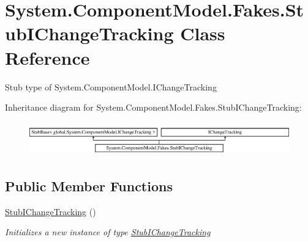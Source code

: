 \hypertarget{class_system_1_1_component_model_1_1_fakes_1_1_stub_i_change_tracking}{\section{System.\-Component\-Model.\-Fakes.\-Stub\-I\-Change\-Tracking Class Reference}
\label{class_system_1_1_component_model_1_1_fakes_1_1_stub_i_change_tracking}
}


Stub type of System.\-Component\-Model.\-I\-Change\-Tracking 


Inheritance diagram for System.\-Component\-Model.\-Fakes.\-Stub\-I\-Change\-Tracking\-:\begin{figure}[H]
\begin{center}
\leavevmode
\includegraphics[height=1.485411cm]{class_system_1_1_component_model_1_1_fakes_1_1_stub_i_change_tracking}
\end{center}
\end{figure}
\subsection*{Public Member Functions}
\begin{DoxyCompactItemize}
\item 
\hyperlink{class_system_1_1_component_model_1_1_fakes_1_1_stub_i_change_tracking_a7e0b743d56def7fd7da3bbb87fdc7879}{Stub\-I\-Change\-Tracking} ()
\begin{DoxyCompactList}\small\item\em Initializes a new instance of type \hyperlink{class_system_1_1_component_model_1_1_fakes_1_1_stub_i_change_tracking}{Stub\-I\-Change\-Tracking}\end{DoxyCompactList}\end{DoxyCompactItemize}
